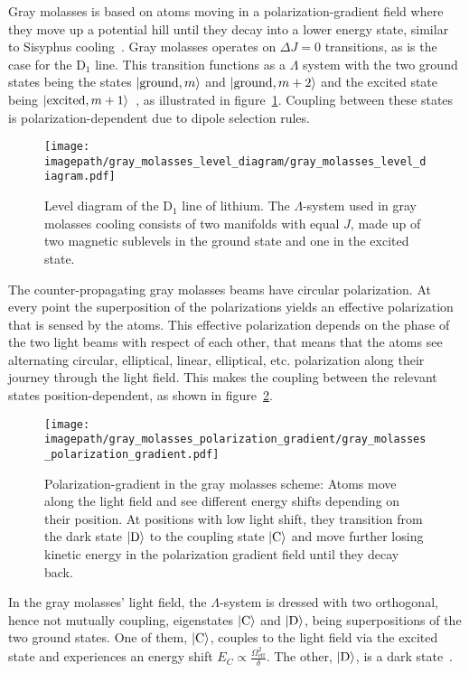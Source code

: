 Gray molasses is based on atoms moving in a polarization-gradient field where they move up a potential hill until they decay into a lower energy state, similar to Sisyphus cooling~\cite{foot_atomic_2005}. Gray molasses operates on $\Delta J = 0$ transitions, as is the case for the D$_1$ line. This transition functions as a $\Lambda$ system with the two ground states being the states $\Ket{\text{ground}, m}$ and $\Ket{\text{ground}, m + 2}$ and the excited state being $\Ket{\text{excited}, m + 1}$~\cite{weidemuller_novel_1994}, as illustrated in figure~\ref{fig:gray_molasses_level_diagram}. Coupling between these states is polarization-dependent due to dipole selection rules.
\begin{figure}
    \centering
    \texttt{[image: \\imagepath/gray\_molasses\_level\_diagram/gray\_molasses\_level\_diagram.pdf]}
    \caption{Level diagram of the D$_1$ line of lithium. The $\Lambda$-system used in gray molasses cooling consists of two manifolds with equal $J$, made up of two magnetic sublevels in the ground state and one in the excited state.}\label{fig:gray_molasses_level_diagram}
\end{figure}

The counter-propagating gray molasses beams have circular polarization. At every point the superposition of the polarizations yields an effective polarization that is sensed by the atoms. This effective polarization depends on the phase of the two light beams with respect of each other, that means that the atoms see alternating circular, elliptical, linear, elliptical, etc. polarization along their journey through the light field. This makes the coupling between the relevant states position-dependent, as shown in figure~\ref{fig:gray_molasses_polarization_gradient}.

\begin{figure}
    \centering
    \texttt{[image: \\imagepath/gray\_molasses\_polarization\_gradient/gray\_molasses\_polarization\_gradient.pdf]}
    \caption{Polarization-gradient in the gray molasses scheme: Atoms move along the light field and see different energy shifts depending on their position. At positions with low light shift, they transition from the dark state $\Ket{\text{D}}$ to the coupling state $\Ket{\text{C}}$ and move further losing kinetic energy in the polarization gradient field until they decay back.}\label{fig:gray_molasses_polarization_gradient}
\end{figure}

In the gray molasses' light field, the $\Lambda$-system is dressed with two orthogonal, hence not mutually coupling, eigenstates $\Ket{\text{C}}$ and $\Ket{\text{D}}$, being superpositions of the two ground states. One of them, $\Ket{\text{C}}$, couples to the light field via the excited state and experiences an energy shift $E_C \propto \frac{\Omega_\text{eff}^2}{\delta}$. The other, $\Ket{\text{D}}$, is a dark state~\cite{weidemuller_novel_1994,gerken_gray_2016}.

